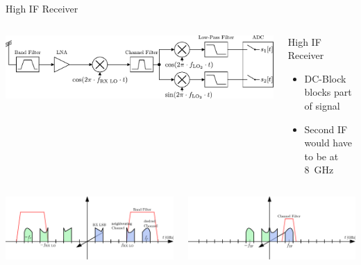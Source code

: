 \documentclass[10pt]{beamer}
\begin{document}
\begin{frame}{High IF Receiver}
  \begin{columns}[T]
    \begin{column}{.6\textwidth}
      \includegraphics[width=\textwidth]{figures/rx_0_bd}
    \end{column}
    \begin{column}{.4\textwidth}
      \begin{block}{High IF Receiver}
        \begin{itemize}
        \item DC-Block blocks part of signal
        \item Second IF would have to be at 8~GHz
        \end{itemize}
      \end{block}
    \end{column}
  \end{columns}
  \begin{columns}[T]
    \begin{column}{.5\textwidth}
      \includegraphics[width=\textwidth]{figures/rx_rf_0_freq_s}
    \end{column}
    \begin{column}{.5\textwidth}
      \includegraphics[width=\textwidth]{figures/rx_rf_0_freq_i}
    \end{column}
  \end{columns}
  \vspace{11ex}
\end{frame}
\end{document}
